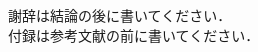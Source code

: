 \documentclass[a4paper]{jarticle}
\begin{document}
 謝辞は結論の後に書いてください．\\

 付録は参考文献の前に書いてください．

\end{document}
